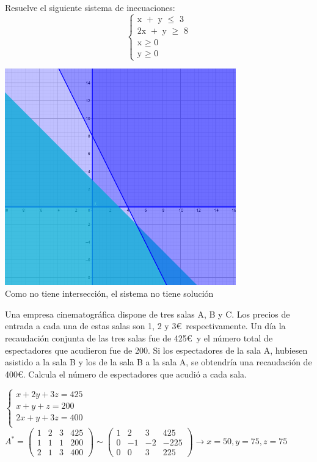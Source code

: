 \documentclass[addpoints,spanish, 12pt,a4paper]{exam}
\begin{document}
\begin{questions}
\question[8] Resuelve el siguiente sistema de inecuaciones:
\[\left\{ {\begin{array}{*{20}{c}}
  {{\text{x }} + {\text{ y }} \leqslant {\text{ 3}}} \\ 
  {{\text{2x }} + {\text{ y }} \geqslant {\text{ 8}}} \\ 
  {{\text{x }} \geqslant {\text{ 0}}} \\ 
  {{\text{y }} \geqslant {\text{ 0}}} 
\end{array}} \right.\]
\begin{solution}
    \includegraphics[width=10cm]{pendientes_1_bach/1_sociales/prog_lin.png} \\
    Como no tiene intersección, el sistema no tiene solución
\end{solution}



\question[10] Una empresa cinematográfica dispone de tres salas A, B y C. Los precios de entrada a cada una de estas salas son 1, 2 y 3\euro \ respectivamente. Un día la recaudación conjunta de las tres salas fue de 425\euro \ y el número total de espectadores que acudieron fue de 200. Si los espectadores de la sala A, hubiesen asistido a la sala B y los de la sala B a la sala A, se obtendría una recaudación de 400\euro. Calcula el número de espectadores que acudió a cada sala.
\begin{solution}
    $\left\{ \begin{matrix}x + 2 y + 3 z = 425 \\ x + y + z = 200 \\ 2 x + y + 3 z = 400 \\ \end{matrix}\right.$ \\
    $A^*=\left(\begin{matrix}1 & 2 & 3 & 425\\1 & 1 & 1 & 200\\2 & 1 & 3 & 400\end{matrix}\right)\sim\left(\begin{matrix}1 & 2 & 3 & 425\\0 & -1 & -2 & -225\\0 & 0 & 3 & 225\end{matrix}\right)\to x=50, y=75, z=75$
\end{solution}


\end{questions}
\end{document}
